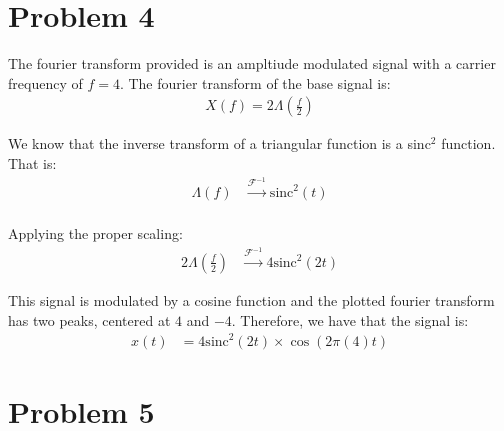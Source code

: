 \documentclass{article}
\begin{document}
\section{Problem 4}
The fourier transform provided is an ampltiude modulated signal with a carrier frequency of $f = 4$. The fourier transform of the base signal is:
\begin{align*}
    X(f) = 2\Lambda\left(\frac{f}{2}\right)
\end{align*}

We know that the inverse transform of a triangular function is a sinc$^2$ function. That is:
\begin{align*}
    \Lambda(f) &\xrightarrow{\mathcal{F}^{-1}} \text{sinc}^2(t) \\
\end{align*}

Applying the proper scaling:
\begin{align*}
    2\Lambda\left(\frac{f}{2}\right) &\xrightarrow{\mathcal{F}^{-1}} 4\text{sinc}^2(2t)
\end{align*}

This signal is modulated by a cosine function and the plotted fourier transform has two peaks, centered at $4$ and $-4$. Therefore, we have that the signal is:
\begin{align*}
    x(t) &= 4\text{sinc}^2(2t) \times \cos(2\pi (4) t)
\end{align*}

\section{Problem 5}
\end{document}
